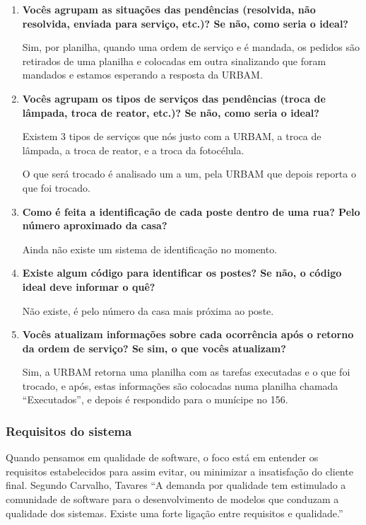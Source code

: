 \documentclass[
	article,			%
	11pt,				%
	oneside,			%
	a4paper,			%
	english,			%
	brazil,				%
	sumario=tradicional
	]{abntex2}
\begin{document}
\begin{enumerate}
\item \textbf{Vocês agrupam as situações das pendências (resolvida, não resolvida,
enviada para serviço, etc.)? Se não, como seria o ideal?}

Sim, por planilha, quando uma ordem de serviço e é mandada, os pedidos são
retirados de uma planilha e colocadas em outra sinalizando que foram mandados
e estamos esperando a resposta da URBAM.

\item \textbf{Vocês agrupam os tipos de serviços das pendências (troca de lâmpada,
troca de reator, etc.)? Se não, como seria o ideal?}

Existem 3 tipos de serviços que nós justo com a URBAM, a troca de lâmpada, a
troca de reator, e a troca da fotocélula.

O que será trocado é analisado um a um, pela URBAM que depois reporta o que
foi trocado.

\item \textbf{Como é feita a identificação de cada poste dentro de uma rua? Pelo
número aproximado da casa?}

Ainda não existe um sistema de identificação no momento.

\item \textbf{Existe algum código para identificar os postes? Se não, o código ideal
deve informar o quê?}

Não existe, é pelo número da casa mais próxima ao poste.

\item \textbf{Vocês atualizam informações sobre cada ocorrência após o retorno da
ordem de serviço? Se sim, o que vocês atualizam?}

Sim, a URBAM retorna uma planilha com as tarefas executadas e o que foi
trocado, e após, estas informações são colocadas numa planilha chamada
“Executados”, e depois é respondido para o munícipe no 156.
\end{enumerate}

\subsubsection{Requisitos do sistema}

Quando pensamos em qualidade de software, o foco está em entender os requisitos
estabelecidos para assim evitar, ou minimizar a insatisfação do cliente final.
Segundo Carvalho, Tavares “A demanda por qualidade tem estimulado a
comunidade de software para o desenvolvimento de modelos que conduzam a
qualidade dos sistemas. Existe uma forte ligação entre requisitos e qualidade.”
\cite{tematec}
\end{document}
